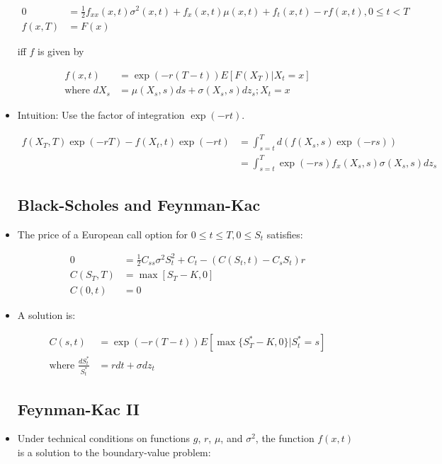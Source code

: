 \documentclass{article}
\begin{document}
\begin{itemize}
\begin{align*}
0 &= \frac{1}{2} f_{xx} (x, t) \sigma^2(x, t) + f_x(x, t) \mu(x, t) + f_t(x, t) - r f(x, t), 0 \le t < T\\
f(x, T) &= F(x)
\end{align*}

iff $f$ is given by

\begin{align*}
f(x, t) &= \exp(-r(T-t)) E[F(X_T)| X_t = x] \\
\text{where } dX_s &= \mu (X_s, s) ds + \sigma(X_s, s) dz_s; X_t = x
\end{align*}

\item Intuition: Use the factor of integration $\exp(-rt)$.

\begin{align*}
f(X_T, T) \exp(-rT) - f(X_t, t) \exp(-rt) 
&= \int_{s=t}^T d(f(X_s, s) \exp(-rs))\\
&= \int_{s=t}^T \exp(-rs) f_x(X_s, s) \sigma(X_s, s) dz_s
\end{align*}

\subsection*{Black-Scholes and Feynman-Kac}

\item The price of a European call option for $0 \le t \le T, 0 \le S_t$ satisfies:

\begin{align*}
0 &= \frac{1}{2} C_{ss} \sigma^2 S_t^2 + C_t - (C(S_t, t) - C_s S_t)r \\
C(S_T, T) &= \max[S_T - K, 0] \\
C(0, t) &= 0 
\end{align*}

\item A solution is:

\begin{align*}
C(s, t) &= \exp(-r(T-t)) E[\max\{S_T^* - K, 0\}| S_t^* = s]\\
\text{where } \frac{dS_t^*}{S_t^*} &= rdt + \sigma dz_t
\end{align*}


\subsection*{Feynman-Kac II}

\item Under technical conditions on functions $g$, $r$, $\mu$, and $\sigma^2$, the function $f(x, t)$ is a solution to the boundary-value problem:


\end{itemize}
\end{document}
